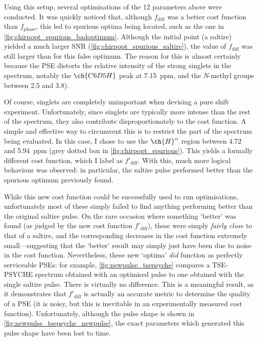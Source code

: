 Using this setup, several optimisations of the 12 parameters above were conducted.
It was quickly noticed that, although $f_\text{diff}$ was a better cost function than $f_\text{phase}$, this led to spurious optima being located, such as the one in \cref{fig:chirpopt_spurious_badoptimum}.
Although the initial point (a saltire) yielded a much larger SNR (\cref{fig:chirpopt_spurious_saltire}), the value of $f_\text{diff}$ was still larger than for this false optimum.
The reason for this is almost certainly because the PSE distorts the relative intensity of the strong singlets in the spectrum, notably the $\ch{C6D5H}$ peak at \SI{7.15}{ppm}, and the \textit{N}-methyl groups between 2.5 and \SI{3.8}{\ppm}).

Of course, singlets are completely unimportant when devising a pure shift experiment.
Unfortunately, since singlets are typically more intense than the rest of the spectrum, they also contribute disproportionately to the cost function.
A simple and effective way to circumvent this is to restrict the part of the spectrum being evaluated.
In this case, I chose to use the $\ch{H}^{\alpha}$ region between 4.72 and \SI{5.94}{ppm} (grey dotted box in \cref{fig:chirpopt_spurious}).
This yields a formally different cost function, which I label as $f'_\text{diff}$.
With this, much more logical behaviour was observed: in particular, the saltire pulse performed better than the spurious optimum previously found.

While this new cost function could be successfully used to run optimisations, unfortunately most of these simply failed to find anything performing better than the original saltire pulse.
On the rare occasion where something `better' was found (as judged by the new cost function $f'_\text{diff}$), these were simply \textit{fairly close} to that of a saltire, and the corresponding decreases in the cost function extremely small---suggesting that the `better' result may simply just have been due to noise in the cost function.
Nevertheless, these new `optima' \textit{did} function as perfectly serviceable PSEs: for example, \cref{fig:newpulse_tsepsyche} compares a TSE-PSYCHE spectrum obtained with an optimised pulse to one obtained with the single saltire pulse.
There is virtually no difference.
This is a meaningful result, as it demonstrates that $f'_\text{diff}$ is actually an accurate metric to determine the quality of a PSE (it is noisy, but this is inevitable in an experimentally measured cost function).
Unfortunately, although the pulse shape is shown in \cref{fig:newpulse_tsepsyche_newpulse}, the exact parameters which generated this pulse shape have been lost to time.

